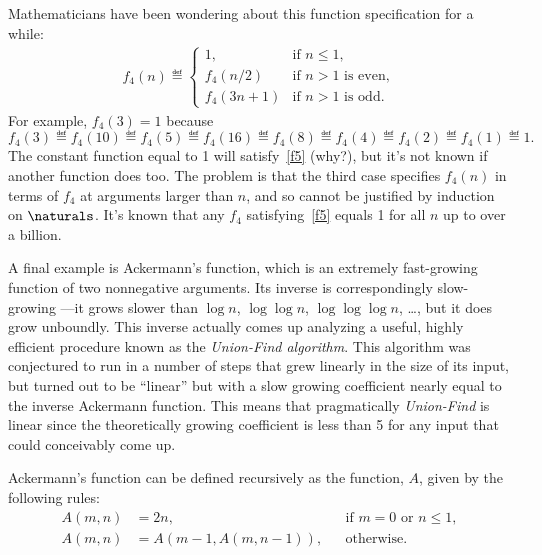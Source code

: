 Mathematicians have been wondering about this function specification for a
while:
\begin{eqnarray}\label{f5}
f_4(n) \eqdef\begin{cases}
 1, & \text{if $n\le 1$},\\
 f_4(n/2) &  \text{if $n>1$ is even},\\
 f_4(3n+1)& \text{if $n>1$ is odd}.
\end{cases}
\end{eqnarray}
For example, $f_4(3)=1$ because
\[
f_4(3)\eqdef f_4(10)\eqdef f_4(5)\eqdef f_4(16)\eqdef f_4(8)\eqdef
f_4(4)\eqdef f_4(2)\eqdef f_4(1)\eqdef 1.
\]
The constant function equal to 1 will satisfy~\eqref{f5} (why?), but it's not
known if another function does too.  The problem is that the third case
specifies $f_4(n)$ in terms of $f_4$ at arguments larger than $n$, and so
cannot be justified by induction on $\naturals$.  It's known that any
$f_4$ satisfying~\eqref{f5} equals 1 for all $n$ up to over a billion.

\iffalse
\textbf{Quick exercise:} Why does the constant function 1
satisfy~\eqref{f5}?
\fi

A final example is Ackermann's function, which is an extremely
fast-growing function of two nonnegative arguments.  Its inverse is
correspondingly slow-growing ---it grows slower than $\log n$, $\log \log
n$, $\log \log \log n$, \dots, but it does grow unboundly.  This inverse
actually comes up analyzing a useful, highly efficient procedure known as
the \emph{Union-Find algorithm}.  This algorithm was conjectured to run in
a number of steps that grew linearly in the size of its input, but turned
out to be ``linear'' but with a slow growing coefficient nearly equal to
the inverse Ackermann function.  This means that pragmatically
\emph{Union-Find} is linear since the theoretically growing coefficient is
less than 5 for any input that could conceivably come up.

\iffalse
You will learn about Union-Find if you take the Algorithms course, 6.046.
We're mentioning this story to motivate an examination of the somewhat
unusual recursive definition of Ackermann's function, $A(m,n)$.
\fi

Ackermann's function can be defined recursively as the function, $A$,
given by the following rules:
\begin{align}
A(m,n) &=  2n, &&\text{if $m=0$ or $n \le 1$},\label{Am0}\\ 
A(m,n) &=  A(m-1,A(m,n-1)), &&\text{otherwise}.\label{AA}
\end{align}

